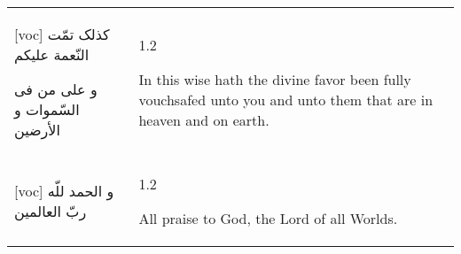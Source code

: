 \documentclass[11pt]{article}
\makeatletter
\newenvironment{orig}
  {\begin{farsi}[voc]}
  {\end{farsi}}
\newenvironment{trans}
  {\Large\begin{spacing}{1.2}\raggedright}
  {\end{spacing}}
\newenvironment{word}
  {\begin{tabular}[t]{p{2.75in}@{\hspace{3em}}p{2.75in}}}
  {\end{tabular}}
\newcommand{\ayat}[2]{\begin{orig}#1\end{orig} & \begin{trans}#2\end{trans}}
\makeatother
\begin{document}
\pagebreak

\begin{word}
\ayat{
کذلک تمّت النّعمة عليکم

و علی من فی السّموات و الأرضين
}{In this wise hath the divine favor been fully vouchsafed unto you and
  unto them that are in heaven and on earth.} \vspace{-1ex}\\ \ayat{
و الحمد للّه ربّ العالمين
}{All praise to God, the Lord of all Worlds.}
\end{word}
\end{document}
